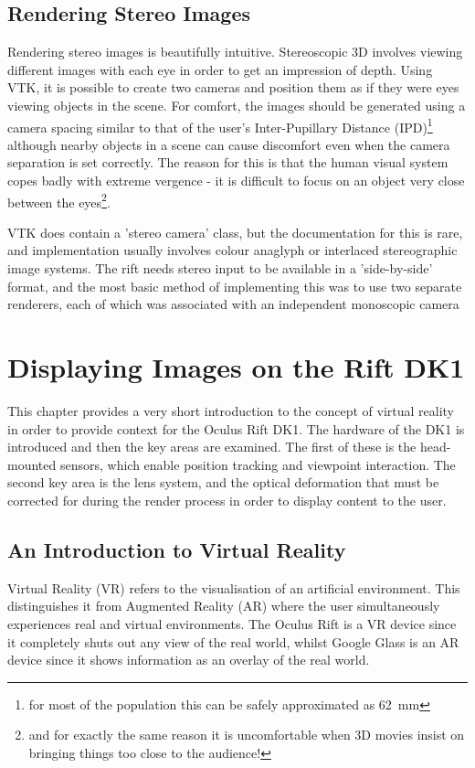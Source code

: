\documentclass[MSc,paper=a4,pagesize=auto]{icldt}
\begin{document}
\section{Rendering Stereo Images}
Rendering stereo images is beautifully intuitive. Stereoscopic 3D involves viewing different images with each eye in order to get an impression of depth. Using VTK, it is possible to create two cameras and position them as if they were eyes viewing objects in the scene. For comfort, the images should be generated using a camera spacing similar to that of the user's Inter-Pupillary Distance (IPD)\footnote{for most of the population this can be safely approximated as \SI{62}{\mm}} although nearby objects in a scene can cause discomfort even when the camera separation is set correctly. The reason for this is that the human visual system copes badly with extreme vergence - it is difficult to focus on an object very close between the eyes\footnote{and for exactly the same reason it is uncomfortable when 3D movies insist on bringing things too close to the audience!}. 

VTK does contain a 'stereo camera' class, but the documentation for this is rare, and implementation usually involves colour anaglyph or interlaced stereographic image systems. The rift needs stereo input to be available in a 'side-by-side' format, and the most basic method of implementing this was to use two separate renderers, each of which was associated with an independent monoscopic camera 


\chapter{Displaying Images on the Rift DK1}
This chapter provides a very short introduction to the concept of virtual reality in order to provide context for the Oculus Rift DK1. The hardware of the DK1 is introduced and then the key areas are examined. The first of these is the head-mounted sensors, which enable position tracking and viewpoint interaction. The second key area is the lens system, and the optical deformation that must be corrected for during the render process in order to display content to the user. 

\section{An Introduction to Virtual Reality}
Virtual Reality (VR) refers to the visualisation of an artificial environment. This distinguishes it from Augmented Reality (AR) where the user simultaneously experiences real and virtual environments. The Oculus Rift is a VR device since it completely shuts out any view of the real world, whilst Google Glass is an AR device since it shows information as an overlay of the real world.
\end{document}

